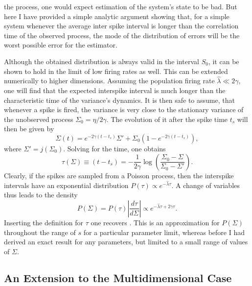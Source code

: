 the process, one would expect estimation of the system's state to be bad. But here I have provided a simple analytic argument showing that, for a simple system
whenever the average inter spike interval is longer than the correlation time of the observed process, the mode of the distribution of errors will be the worst possible 
error for the estimator.
\par
Although the obtained distribution is always valid in the interval $S_0$, it can be shown to hold in the limit of low firing rates as well. This 
can be extended numerically to higher dimensions. Assuming the population firing rate $\hat{\lambda} \ll 2\gamma$, one will find that the expected interspike interval is much longer than the 
characteristic time of the variance's dynamics. It is then safe to assume, that whenever a spike is fired, the variance is very close to the stationary variance of the unobserved process 
$\Sigma_0 = \eta/2\gamma$. The 
evolution of it after the spike time $t_s$ will then be given by
\[
\Sigma(t) = e^{-2\gamma(t-t_s)} \Sigma' + \Sigma_0 \left(1-e^{-2\gamma (t-t_s)}\right),
\]
where $\Sigma' = j(\Sigma_0)$.
Solving for the time, one obtains
\[
\tau(\Sigma) \equiv (t-t_s) = -\frac{1}{2\gamma} \log\left(\frac{\Sigma_0-\Sigma}{\Sigma_0-\Sigma'}\right).
\]
Clearly, if the spikes are sampled from a Poisson process, then the interspike intervals have an exponential distribution $P(\tau) \propto e^{-\hat{\lambda}\tau}$. A change of 
variables thus leads to the density
\[
P(\Sigma) = P(\tau) \left|\frac{d\tau}{d\Sigma}\right| \propto e^{-\hat{\lambda} \tau + 2\gamma \tau}.
\]
Inserting the definition for $\tau$ one recovers . This is an approximation for $P(\Sigma)$ throughout the range of $s$ for a particular parameter limit, whereas before
I had derived an exact result for any parameters, but limited to a small range of values of $\Sigma$.\par

\subsection{An Extension to the Multidimensional Case}

